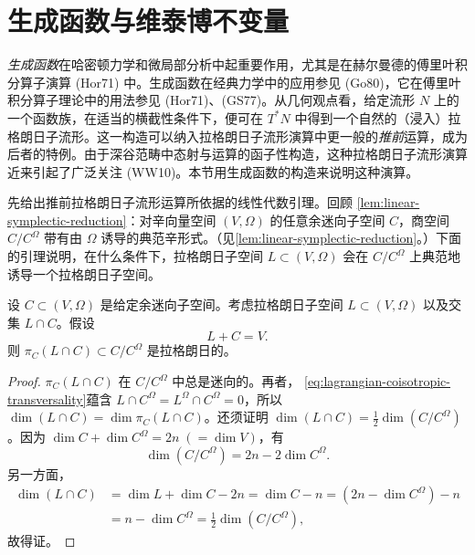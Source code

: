 \section{生成函数与维泰博不变量}
\label{sec:generating-functions-viterbo-invariants}

\emph{生成函数}在哈密顿力学和微局部分析中起重要作用，尤其是在赫尔曼德的傅里叶积分算子演算 (Hor71) 中。生成函数在经典力学中的应用参见 (Go80)，它在傅里叶积分算子理论中的用法参见 (Hor71)、(GS77)。从几何观点看，给定流形 $N$ 上的一个函数族，在适当的横截性条件下，便可在 $T^*N$ 中得到一个自然的（浸入）拉格朗日子流形。这一构造可以纳入拉格朗日子流形演算中更一般的\emph{推前}运算，成为后者的特例。由于深谷范畴中态射与运算的函子性构造，这种拉格朗日子流形演算近来引起了广泛关注 (WW10)。本节用生成函数的构造来说明这种演算。

先给出推前拉格朗日子流形运算所依据的线性代数引理。回顾
\cref{lem:linear-symplectic-reduction}：对辛向量空间 $(V,\Omega)$ 的任意余迷向子空间 $C$，商空间 $C/C^\Omega$ 带有由 $\Omega$ 诱导的典范辛形式。（见\cref{lem:linear-symplectic-reduction}。）下面的引理说明，在什么条件下，拉格朗日子空间
$L\subset(V,\Omega)$ 会在 $C/C^\Omega$ 上典范地诱导一个拉格朗日子空间。

\begin{lemma}\label{lem:lagrangian-coisotropic-reduction}
设 $C\subset(V,\Omega)$ 是给定余迷向子空间。考虑拉格朗日子空间
$L\subset(V,\Omega)$ 以及交集 $L\cap C$。假设
\begin{equation}
 L+C=V.
 \label{eq:lagrangian-coisotropic-transversality}
\end{equation}
则 $\pi_C(L\cap C)\subset C/C^\Omega$ 是拉格朗日的。
\end{lemma}

\begin{proof}
$\pi_C(L\cap C)$ 在 $C/C^\Omega$ 中总是迷向的。再者，
\eqref{eq:lagrangian-coisotropic-transversality}蕴含
$L\cap C^\Omega=L^\Omega\cap C^\Omega=0$，所以
$\dim(L\cap C)=\dim\pi_C(L\cap C)$。还须证明
$\dim(L\cap C)=\frac12\dim(C/C^\Omega)$。因为
$\dim C+\dim C^\Omega=2n\;(=\dim V)$，有
\[
 \dim(C/C^\Omega)=2n-2\dim C^\Omega.
\]
另一方面，
\[
\begin{aligned}
 \dim(L\cap C)
 &=\dim L+\dim C-2n
 =\dim C-n=(2n-\dim C^\Omega)-n\\
 &=n-\dim C^\Omega
 =\frac12\dim(C/C^\Omega),
\end{aligned}
\]
故得证。
\end{proof}

